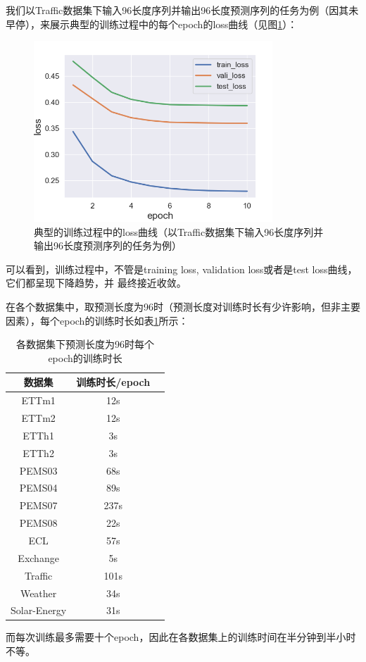 \documentclass[twoside,12pt]{article}
\begin{document}
我们以Traffic数据集下输入96长度序列并输出96长度预测序列的任务为例（因其未早停），来展示典型的训练过程中的每个epoch的loss曲线（见图\ref{fig:loss}）：
\begin{figure}[htbp]
  \centering
  \includegraphics[width=0.8\textwidth]{./pic/loss_plot.png}
  \caption{\small{典型的训练过程中的loss曲线（以Traffic数据集下输入96长度序列并输出96长度预测序列的任务为例）}}
  \label{fig:loss}
\end{figure}

可以看到，训练过程中，不管是training loss, validation loss或者是test loss曲线，它们都呈现下降趋势，并 最终接近收敛。

在各个数据集中，取预测长度为96时（预测长度对训练时长有少许影响，但非主要因素），每个epoch的训练时长如表\ref{tab:time}所示：
\begin{table}[htbp]
  \caption{\small{各数据集下预测长度为96时每个epoch的训练时长}}
  \label{tab:time}
  \vspace{5pt}
  \centering
  \begin{tabular}{ccc}
    \toprule
    数据集       & 训练时长/epoch \\
    \midrule
    ETTm1        & 12s            \\
    ETTm2        & 12s            \\
    ETTh1        & 3s             \\
    ETTh2        & 3s             \\
    PEMS03       & 68s            \\
    PEMS04       & 89s            \\
    PEMS07       & 237s           \\
    PEMS08       & 22s            \\
    ECL          & 57s            \\
    Exchange     & 5s             \\
    Traffic      & 101s           \\
    Weather      & 34s            \\
    Solar-Energy & 31s            \\
    \bottomrule
  \end{tabular}
\end{table}
而每次训练最多需要十个epoch，因此在各数据集上的训练时间在半分钟到半小时不等。
\end{document}
